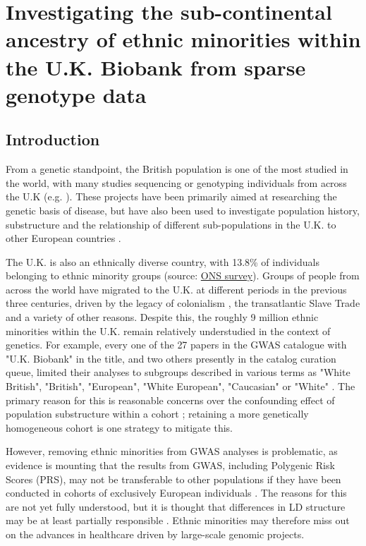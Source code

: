 \chapter{Investigating the sub-continental ancestry of ethnic minorities within the U.K. Biobank from sparse genotype data}
\label{chapterlabel3}

\section{Introduction}

From a genetic standpoint, the British population is one of the most studied in the world, with many studies sequencing or genotyping individuals from across the U.K (e.g. \cite{bycroft2018UK, Leslie2015, turnbull2018introducing, UK10k2015UK10k}). These projects have been primarily aimed at researching the genetic basis of disease, but have also been used to investigate population history, substructure  and the relationship of different sub-populations in the U.K. to other European countries \cite{Leslie2015, schiffels2016iron, liu2020human}.  

The U.K. is also an ethnically diverse country, with 13.8\% of individuals belonging to ethnic minority groups (source: \href{https://www.ons.gov.U.K./peoplepopulationandcommunity/populationandmigration/populationestimates/articles/researchreportonpopulationestimatesbyethnicgroupandreligion/2019-12-04}{ONS survey}). Groups of people from across the world have migrated to the U.K. at different periods in the previous three centuries, driven by the legacy of colonialism \cite{nasta2005voyaging}, the transatlantic Slave Trade and a variety of other reasons. Despite this, the roughly 9 million ethnic minorities within the U.K. remain relatively understudied in the context of genetics. For example, every one of the 27 papers in the GWAS catalogue with "U.K. Biobank" in the title, and two others presently in the catalog curation queue, limited their analyses to subgroups described in various terms as "White British", "British", "European", "White European", "Caucasian" or "White" \cite{manolio2019using}. The primary reason for this is reasonable concerns over the confounding effect of population substructure within a cohort \cite{hellwege2017population}; retaining a more genetically homogeneous cohort is one strategy to mitigate this. 

However, removing ethnic minorities from GWAS analyses is problematic, as evidence is mounting that the results from GWAS, including Polygenic Risk Scores (PRS), may not be transferable to other populations if they have been conducted in cohorts of exclusively European individuals \cite{kuchenbaecker2019transferability, martin2017human, bustamante2011genomics}. The reasons for this are not yet fully understood, but it is thought that differences in LD structure may be at least partially responsible \cite{vilhjalmsson2015modeling}. Ethnic minorities may therefore miss out on the advances in healthcare driven by large-scale genomic projects. 


